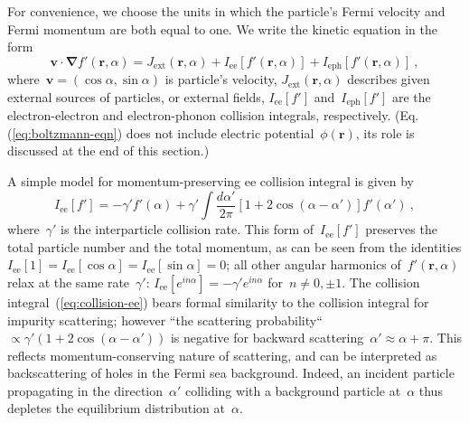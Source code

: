 \documentclass[preprint,aps,eqsecnum]{revtex4-1}
\begin{document}
For convenience, we choose the units in which the particle's
Fermi velocity and Fermi momentum are both equal to one.
We write the kinetic equation in the form
\begin{equation}
  \label{eq:boltzmann-eqn}
{\bm v}\cdot{\bm \nabla} f'({\bm r}, \alpha)
= J_{\mathrm{ext}}({\bm r}, \alpha) + I_\mathrm{ee}[f'({\bm r}, \alpha)]
+ I_\mathrm{eph}[f'({\bm r}, \alpha)]
\ ,
\end{equation}
where~${\bm v} = (\cos\alpha, \sin\alpha)$ is particle's velocity,
$J_\mathrm{ext}({\bm r}, \alpha)$ describes given external sources
of particles, or external fields, $I_\mathrm{ee}[f']$
and~$I_\mathrm{eph}[f']$ are the electron-electron and
electron-phonon collision integrals, respectively.
(Eq.(\ref{eq:boltzmann-eqn}) does not include electric
potential~$\phi({\bm r})$,
its role is discussed at the end of this section.)

A simple model for momentum-preserving ee collision integral is given
by~\cite{Molenkamp}
\begin{equation}
\label{eq:collision-ee}
I_\mathrm{ee}[f'] = - \gamma' f'(\alpha)
  + \gamma' \int \frac{d\alpha'}{2\pi}
  \left[1 + 2 \cos(\alpha - \alpha') \right] f'(\alpha')
\ ,
\end{equation}
where~$\gamma'$ is the interparticle collision rate.
This form of~$I_\mathrm{ee}[f']$
preserves the total particle number
and the total momentum, as can be seen from the identities
$I_\mathrm{ee}[1] = I_\mathrm{ee}[\cos\alpha] = I_\mathrm{ee}[\sin\alpha] = 0$;
all other angular harmonics of~$f'({\bm r}, \alpha)$
relax at the same rate~$\gamma'$:
 $I_\mathrm{ee} [e^{i n \alpha}] = - \gamma' e^{i n\alpha} $
 for~$n\neq 0, \pm 1$.
The collision integral~(\ref{eq:collision-ee}) bears formal similarity
to the collision integral for impurity scattering; however ``the
scattering probability`` $\propto \gamma'( 1 + 2\cos(\alpha-\alpha'))$
is negative for backward scattering~$\alpha' \approx \alpha + \pi$.
This reflects momentum-conserving nature of scattering, and can be
interpreted as backscattering of holes in the Fermi sea background.
Indeed, an incident  particle propagating in the direction~$\alpha'$ colliding  with a background  particle at~$\alpha$ thus depletes the equilibrium distribution at~$\alpha$.
\end{document}
